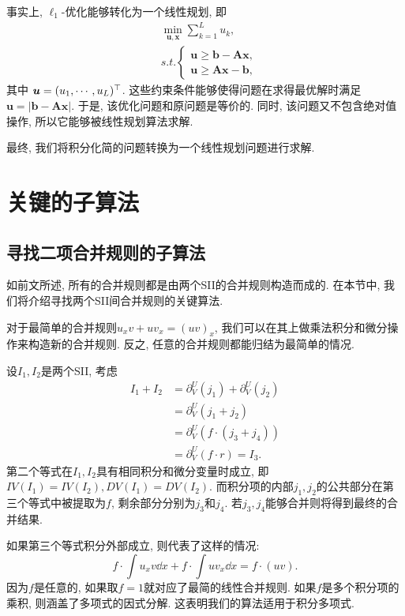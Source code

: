 事实上, $\ell_1$-优化能够转化为一个线性规划\cite{L1_regression}, 即
\begin{equation}
\begin{split}
&\underset{\bm u,\bm x}\min \sum_{k=1}^L{u_k},\\
&s.t. \left\{
\begin{matrix}
\bm{u}\ge \bm{b}-\bm{A}\bm{x},\\ 
\bm{u}\ge \bm{A}\bm{x}-\bm{b},
\end{matrix}
\right.
\end{split}
\label{LP}
\end{equation}
其中 $\bm u=(u_1,\cdots,u_L)^\top$. 这些约束条件能够使得问题在求得最优解时满足$\bm u = |\bm{b}-\bm{A}\bm{x}|$. 于是, 该优化问题和原问题是等价的. 同时, 该问题又不包含绝对值操作, 所以它能够被线性规划算法求解. 

最终, 我们将积分化简的问题转换为一个线性规划问题进行求解.

\section{关键的子算法} \label{Details-03}
\subsection{寻找二项合并规则的子算法} \label{Combine-03}
如前文所述, 所有的合并规则都是由两个SII的合并规则构造而成的. 在本节中, 我们将介绍寻找两个SII间合并规则的关键算法. 

对于最简单的合并规则$u_x v + u v_x = (uv)_x$, 我们可以在其上做乘法\D 积分和微分操作来构造新的合并规则. 反之, 任意的合并规则都能归结为最简单的情况. 

设$I_1,I_2$是两个SII, 考虑 
\begin{equation}
\begin{split}
I_1+I_2 &= \partial^U_V(j_1) + \partial^U_V(j_2) \\
        &= \partial^U_V( j_1+j_2 )\\
        &= \partial^U_V( f\cdot(j_3+j_4) )\\ 
        &= \partial^U_V( f\cdot r ) = I_3 .
\end{split}
\label{combine_form}
\end{equation} 
第二个等式在$I_1,I_2$具有相同积分和微分变量时成立, 即$IV(I_1)=IV(I_2),DV(I_1)=DV(I_2)$. 而积分项的内部$j_1,j_2$的公共部分在第三个等式中被提取为$f$, 剩余部分分别为$j_3$和$j_4$. 若$j_3,j_4$能够合并则将得到最终的合并结果. 

如果第三个等式积分外部成立, 则代表了这样的情况: 
\begin{equation}
f\cdot\int\!{u_x v\dd x}+f\cdot\int\!{u v_x \dd x} = f\cdot(uv).
\end{equation} 
因为$f$是任意的, 如果取$f=1$就对应了最简的线性合并规则. 如果$f$是多个积分项的乘积, 则涵盖了多项式的因式分解. 这表明我们的算法适用于积分多项式. 

